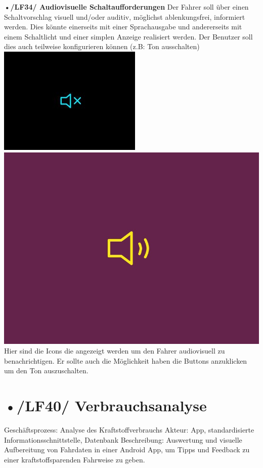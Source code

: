 \textbf{•/LF34/ Audiovisuelle Schaltaufforderungen}
Der Fahrer soll über einen Schaltvorschlag visuell und/oder auditiv, möglichst ablenkungsfrei, informiert werden. Dies könnte einerseits mit einer Sprachausgabe und andererseits mit einem Schaltlicht und einer simplen Anzeige realisiert werden. Der Benutzer soll dies auch teilweise konfigurieren können (z.B: Ton ausschalten)
 \includegraphics[scale=0.5]{images/LF34_leiser.jpg}
  \includegraphics[scale=0.5]{images/LF34_lauter.jpg}
Hier sind die Icons die angezeigt werden um den Fahrer audiovisuell zu benachrichtigen.                                                                    Er sollte auch die Möglichkeit haben die Buttons anzuklicken um den Ton auszuschalten. 

\section{•/LF40/ Verbrauchsanalyse}
Geschäftsprozess:	Analyse des Kraftstoffverbrauchs
Akteur:			App, standardisierte Informationsschnittstelle, Datenbank
Beschreibung:	Auswertung und visuelle Aufbereitung von Fahrdaten in einer Android App, um Tipps und Feedback zu einer kraftstoffsparenden Fahrweise zu geben.


